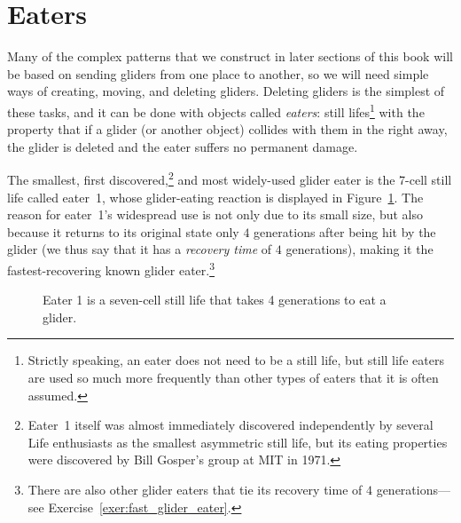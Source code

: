 \section{Eaters}\label{sec:eaters}

Many of the complex patterns that we construct in later sections of this book will be based on sending gliders from one place to another, so we will need simple ways of creating, moving, and deleting gliders. Deleting gliders is the simplest of these tasks, and it can be done with objects called \emph{eaters}: still lifes\footnote{Strictly speaking, an eater does not need to be a still life, but still life eaters are used so much more frequently than other types of eaters that it is often assumed.} with the property that if a glider (or another object) collides with them in the right away, the glider is deleted and the eater suffers no permanent damage.

The smallest, first discovered,\footnote{Eater~1 itself was almost immediately discovered independently by several Life enthusiasts as the smallest asymmetric still life, but its eating properties were discovered by Bill Gosper's group at MIT in 1971.} and most widely-used glider eater is the 7-cell still life called eater~1, whose glider-eating reaction is displayed in Figure~\ref{fig:eater_1}. The reason for eater~1's widespread use is not only due to its small size, but also because it returns to its original state only $4$ generations after being hit by the glider (we thus say that it has a \emph{recovery time} of $4$ generations), making it the fastest-recovering known glider eater.\footnote{There are also other glider eaters that tie its recovery time of $4$ generations---see Exercise~\ref{exer:fast_glider_eater}.}

\begin{figure}[!htb]
	\centering
	\caption{Eater 1 is a seven-cell still life that takes 4 generations to eat a glider.}\label{fig:eater_1}
\end{figure}

